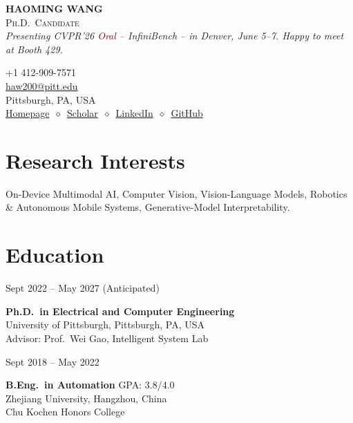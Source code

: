 \documentclass[11pt, letterpaper]{article}
\newenvironment{datedentry}[1]{%
  \par\noindent
  \begin{minipage}[t]{2.8cm}\raggedright\small #1\end{minipage}%
  \hspace{0.3cm}%
  \begin{minipage}[t]{\dimexpr\linewidth-3.1cm\relax}\raggedright
}{\end{minipage}\par\medskip}
\begin{document}
\noindent
\begin{minipage}[t]{0.58\linewidth}
  \vspace{0pt}
  {\fontsize{24pt}{26pt}\selectfont \textbf{HAOMING WANG}}\\[2pt]
  {\scshape\normalsize Ph.D.\ Candidate}\\[2pt]
  {\small \textit{Presenting CVPR'26 \textcolor{darkred}{Oral} -- InfiniBench -- in Denver, June 5--7. Happy to meet at Booth 429.}}
\end{minipage}%
\begin{minipage}[t]{0.42\linewidth}
  \vspace{0pt}
  \raggedleft\small
  +1 412-909-7571 \\
  \href{mailto:haw200@pitt.edu}{haw200@pitt.edu} \\
  Pittsburgh, PA, USA \\[2pt]
  \href{https://haomingwang645.github.io/}{Homepage}\ $\diamond$\ \href{https://scholar.google.com.hk/citations?user=bf6LCjUAAAAJ}{Scholar}\ $\diamond$\ \href{https://www.linkedin.com/in/haoming-wang-40a6a7239/}{LinkedIn}\ $\diamond$\ \href{https://github.com/HaomingWang645}{GitHub}
\end{minipage}

\section{Research Interests}
On-Device Multimodal AI, Computer Vision, Vision-Language Models, Robotics \& Autonomous Mobile Systems, Generative-Model Interpretability.

\section{Education}

\begin{datedentry}{Sept 2022 -- May 2027 (Anticipated)}
\textbf{Ph.D.\ in Electrical and Computer Engineering}\\
University of Pittsburgh, Pittsburgh, PA, USA\\
Advisor: Prof.\ Wei Gao, Intelligent System Lab
\end{datedentry}

\begin{datedentry}{Sept 2018 -- May 2022}
\textbf{B.Eng.\ in Automation} \hfill GPA: 3.8/4.0\\
Zhejiang University, Hangzhou, China\\
Chu Kochen Honors College
\end{datedentry}
\end{document}
